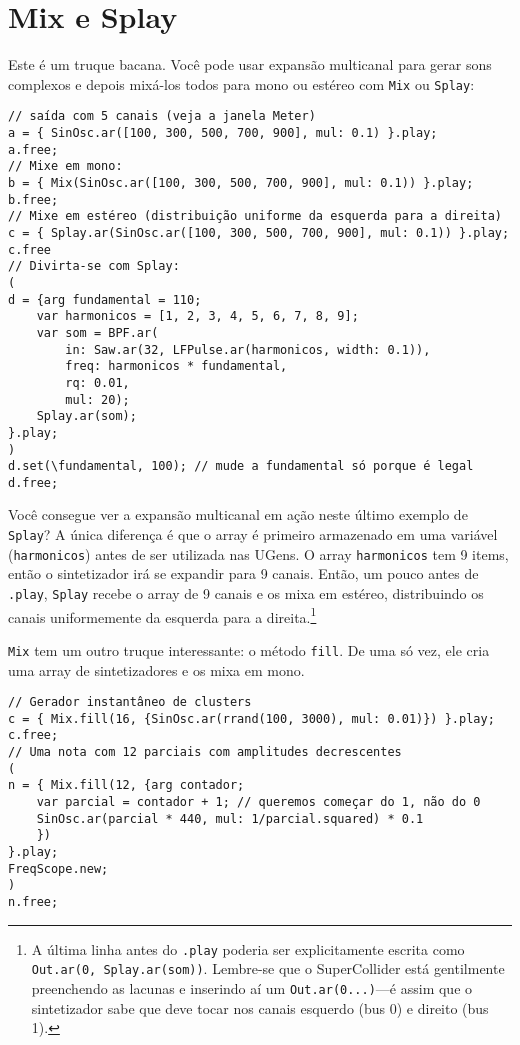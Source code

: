 \section{Mix e Splay}

Este é um truque bacana. Você pode usar expansão multicanal para gerar sons complexos e depois mixá-los todos para mono ou estéreo com \texttt{Mix} ou \texttt{Splay}:
 
\begin{lstlisting}[style=SuperCollider-IDE, basicstyle=\scttfamily\footnotesize]
// saída com 5 canais (veja a janela Meter)
a = { SinOsc.ar([100, 300, 500, 700, 900], mul: 0.1) }.play;
a.free;
// Mixe em mono:
b = { Mix(SinOsc.ar([100, 300, 500, 700, 900], mul: 0.1)) }.play;
b.free;
// Mixe em estéreo (distribuição uniforme da esquerda para a direita)
c = { Splay.ar(SinOsc.ar([100, 300, 500, 700, 900], mul: 0.1)) }.play;
c.free
// Divirta-se com Splay:
(
d = {arg fundamental = 110;
	var harmonicos = [1, 2, 3, 4, 5, 6, 7, 8, 9];
	var som = BPF.ar(
		in: Saw.ar(32, LFPulse.ar(harmonicos, width: 0.1)),
		freq: harmonicos * fundamental,
		rq: 0.01,
		mul: 20);
	Splay.ar(som);	
}.play;
)
d.set(\fundamental, 100); // mude a fundamental só porque é legal
d.free;
\end{lstlisting}
 
Você consegue ver a expansão multicanal em ação neste último exemplo de \texttt{Splay}? A única diferença é que o array é primeiro armazenado em uma variável (\texttt{harmonicos}) antes de ser utilizada nas UGens. O array \texttt{harmonicos} tem 9 items, então o sintetizador irá se expandir para 9 canais. Então, um pouco antes de \texttt{.play}, \texttt{Splay} recebe o array de 9 canais e os mixa em estéreo, distribuindo os canais uniformemente da esquerda para a direita.\footnote{A última linha antes do \texttt{.play} poderia ser explicitamente escrita como \texttt{Out.ar(0, Splay.ar(som))}. Lembre-se que o SuperCollider está gentilmente preenchendo as lacunas e inserindo aí um
\texttt{Out.ar(0...)}---é assim que o sintetizador sabe que deve tocar nos canais esquerdo (bus 0) e direito (bus 1).}

\texttt{Mix} tem um outro truque interessante: o método \texttt{fill}. De uma só vez, ele cria uma array de sintetizadores e os mixa em mono.

\begin{lstlisting}[style=SuperCollider-IDE, basicstyle=\scttfamily\footnotesize]
// Gerador instantâneo de clusters
c = { Mix.fill(16, {SinOsc.ar(rrand(100, 3000), mul: 0.01)}) }.play;
c.free;
// Uma nota com 12 parciais com amplitudes decrescentes
(
n = { Mix.fill(12, {arg contador;
	var parcial = contador + 1; // queremos começar do 1, não do 0
	SinOsc.ar(parcial * 440, mul: 1/parcial.squared) * 0.1
	})
}.play;
FreqScope.new;
)
n.free;
\end{lstlisting}

